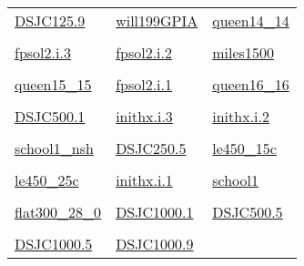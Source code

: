 \documentclass[10pt]{article}
\begin{document}
\begin{tabular}{p{4cm} p{4cm} p{4cm}}
\hyperlink{page.48}{DSJC125.9} & \hyperlink{page.49}{will199GPIA} & \hyperlink{page.50}{queen14\_14} \\ \\
\hyperlink{page.51}{fpsol2.i.3} & \hyperlink{page.52}{fpsol2.i.2} & \hyperlink{page.53}{miles1500} \\ \\
\hyperlink{page.54}{queen15\_15} & \hyperlink{page.55}{fpsol2.i.1} & \hyperlink{page.56}{queen16\_16} \\ \\
\hyperlink{page.57}{DSJC500.1} & \hyperlink{page.58}{inithx.i.3} & \hyperlink{page.59}{inithx.i.2} \\ \\
\hyperlink{page.60}{school1\_nsh} & \hyperlink{page.61}{DSJC250.5} & \hyperlink{page.62}{le450\_15c} \\ \\
\hyperlink{page.63}{le450\_25c} & \hyperlink{page.64}{inithx.i.1} & \hyperlink{page.65}{school1} \\ \\
\hyperlink{page.66}{flat300\_28\_0} & \hyperlink{page.67}{DSJC1000.1} & \hyperlink{page.68}{DSJC500.5} \\ \\
\hyperlink{page.69}{DSJC1000.5} & \hyperlink{page.70}{DSJC1000.9} & \\
\end{tabular}
\pagebreak
{}
\end{document}
